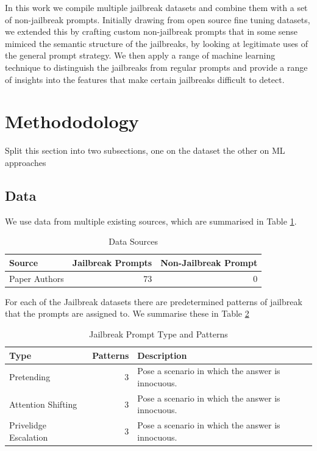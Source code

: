 \documentclass[12pt,a4paper]{article}
\begin{document}
In this work we compile multiple jailbreak datasets and combine them with a set of
non-jailbreak prompts. Initially drawing from open source fine tuning datasets, we
extended this by crafting custom non-jailbreak prompts that in some sense mimiced the
semantic structure of the jailbreaks, by looking at legitimate uses of the general
prompt strategy. We then apply a range of machine learning technique to distinguish 
the jailbreaks from regular prompts and provide a range of insights into the features
that make certain jailbreaks difficult to detect.
 
\section{Methododology}

Split this section into two subsections, one on the dataset the other on ML approaches

\subsection{Data}

We use data from multiple existing sources, which are summarised in Table \ref{tab:sources}.

\begin{table}
\caption{Data Sources}
\label{tab:sources}
\begin{tabular}{l|r|r}
\toprule
Source            &Jailbreak Prompts &Non-Jailbreak Prompt    \\
\midrule
Paper Authors     &73                &0              \\
\bottomrule
\end{tabular}
\end{table}

For each of the Jailbreak datasets there are predetermined patterns of jailbreak that
the prompts are assigned to. We summarise these in Table \ref{tab:prompts}

\begin{table}
\caption{Jailbreak Prompt Type and Patterns}
\label{tab:prompts}
\begin{tabular}{l|r|l}
\toprule
Type                   &Patterns &Description                \\
\midrule
Pretending             &3        &Pose a scenario in which the answer is innocuous.\\
Attention Shifting     &3        &Pose a scenario in which the answer is innocuous.\\
Privelidge Escalation  &3        &Pose a scenario in which the answer is innocuous.\\
\bottomrule
\end{tabular}
\end{table}
\end{document}
